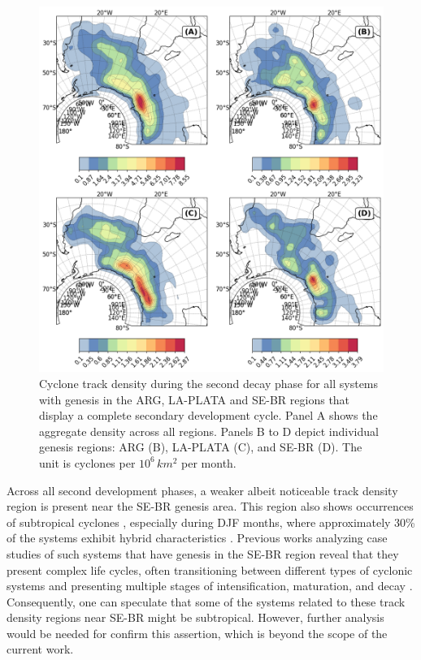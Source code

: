 \begin{figure}[!htbp]
\centering
\includegraphics[width=\textwidth]{figs_4/density_map_decay 2_regions_secondary.png}
\caption[Track Density - Decay 2]{Cyclone track density during the second decay phase for all systems with genesis in the ARG, LA-PLATA and SE-BR regions that display a complete secondary development cycle. Panel A shows the aggregate density across all regions. Panels B to D depict individual genesis regions: ARG (B), LA-PLATA (C), and SE-BR (D). The unit is cyclones per \(10^6 \, km^2\) per month.}
\label{fig:decay_2}
\end{figure}

Across all second development phases, a weaker albeit noticeable track density region is present near the SE-BR genesis area. This region also shows occurrences of subtropical cyclones \cite{evans2012climatology, de2022future, cardoso2022synoptic}, especially during DJF months, where approximately 30\% of the systems exhibit hybrid characteristics \cite{gozzo2014subtropical}. Previous works analyzing case studies of such systems that have genesis in the SE-BR region reveal that they present complex life cycles, often transitioning between different types of cyclonic systems and presenting multiple stages of intensification, maturation, and decay \citep[e.g.,]{dias2013synoptic, veiga2008analysis, reboita2022shapiro, dutra2017structure, reboita2021iba}. Consequently, one can speculate that some of the systems related to these track density regions near SE-BR might be subtropical. However, further analysis would be needed for confirm this assertion, which is beyond the scope of the current work.


